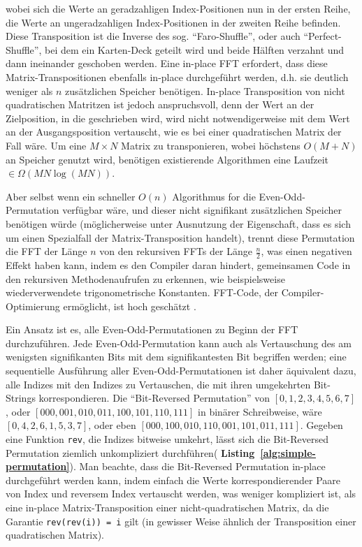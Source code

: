 \documentclass[10pt]{article}
\begin{document}
wobei sich die Werte an geradzahligen Index-Positionen nun in der ersten Reihe, 
die Werte an ungeradzahligen Index-Positionen in der zweiten Reihe befinden.
Diese Transposition ist die Inverse des sog. ``Faro-Shuffle'', oder auch ``Perfect-Shuffle''\cite{sedgewick:algorithms}, 
bei dem ein Karten-Deck geteilt wird und beide Hälften verzahnt und dann ineinander geschoben werden.
Eine in-place FFT erfordert, dass diese Matrix-Transpositionen ebenfalls in-place durchgeführt werden, 
d.h. sie deutlich weniger als $n$ zusätzlichen Speicher benötigen. In-place Transposition von nicht quadratischen Matritzen
ist jedoch anspruchsvoll, denn der Wert an der Zielposition, in die geschrieben wird, wird nicht notwendigerweise mit 
dem Wert an der Ausgangsposition vertauscht, wie es bei einer quadratischen Matrix der Fall wäre.
Um eine $M \times N$ Matrix zu transponieren, wobei höchstens $O(M + N)$ an Speicher genutzt wird, benötigen 
existierende Algorithmen eine Laufzeit  $\in \Omega(M N \log(M N))$\cite{fich:permuting}.

Aber selbst wenn ein schneller $O(n)$ Algorithmus for die Even-Odd-Permutation verfügbar wäre, 
und dieser nicht signifikant zusätzlichen Speicher benötigen würde (möglicherweise unter 
Ausnutzung der Eigenschaft, dass es sich um einen Spezialfall der Matrix-Transposition handelt), 
trennt diese Permutation die FFT der Länge $n$ von den rekursiven FFTs der Länge $\frac{n}{2}$, 
was einen negativen Effekt haben kann, indem es den Compiler daran hindert, gemeinsamen Code in den rekursiven 
Methodenaufrufen zu erkennen, wie beispielsweise wiederverwendete trigonometrische Konstanten.
FFT-Code, der Compiler-Optimierung ermöglicht, ist hoch geschätzt \cite{myrnyy:simple}.

Ein Ansatz ist es, alle Even-Odd-Permutationen zu Beginn der FFT durchzuführen. 
Jede Even-Odd-Permutation kann auch als Vertauschung des am wenigsten signifikanten 
Bits mit dem signifikantesten Bit begriffen werden; eine sequentielle Ausführung aller 
Even-Odd-Permutationen ist daher äquivalent dazu, alle 
Indizes mit den Indizes zu Vertauschen, die mit ihren umgekehrten Bit-Strings korrespondieren. 
Die ``Bit-Reversed Permutation'' von  $[0, 1, 2, 3, 4, 5, 6, 7]$, oder $[000,
  001, 010, 011, 100, 101, 110, 111]$ in binärer Schreibweise, wäre $[0, 4, 2,
  6, 1, 5, 3, 7]$, oder eben $[000, 100, 010, 110, 001, 101, 011, 111]$. 
  Gegeben eine Funktion {\tt rev}, die Indizes bitweise umkehrt, lässt sich die 
Bit-Reversed Permutation ziemlich unkompliziert durchführen({\bf
Listing~\ref{alg:simple-permutation}}). Man beachte, dass die Bit-Reversed 
Permutation in-place durchgeführt werden kann, indem einfach die Werte korrespondierender 
Paare von Index und reversem Index vertauscht werden, was weniger kompliziert ist, als eine 
in-place Matrix-Transposition einer nicht-quadratischen Matrix, da die Garantie 
{\tt rev(rev(i)) = i} gilt (in gewisser Weise ähnlich der Transposition einer 
quadratischen Matrix).
\end{document}
